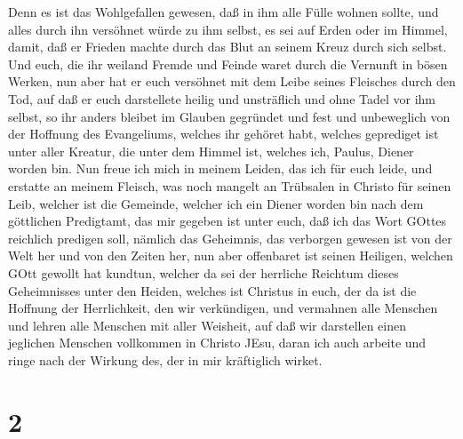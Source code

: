 Denn es ist das Wohlgefallen gewesen, daß in ihm alle Fülle wohnen
sollte,  und alles durch ihn versöhnet würde zu ihm selbst,
es sei auf Erden oder im Himmel, damit, daß er Frieden machte durch das
Blut an seinem Kreuz durch sich selbst.  Und euch, die ihr
weiland Fremde und Feinde waret durch die Vernunft in bösen Werken,
 nun aber hat er euch versöhnet mit dem Leibe seines
Fleisches durch den Tod, auf daß er euch darstellete heilig und
unsträflich und ohne Tadel vor ihm selbst,  so ihr anders
bleibet im Glauben gegründet und fest und unbeweglich von der Hoffnung
des Evangeliums, welches ihr gehöret habt, welches geprediget ist unter
aller Kreatur, die unter dem Himmel ist, welches ich, Paulus, Diener
worden bin.  Nun freue ich mich in meinem Leiden, das ich
für euch leide, und erstatte an meinem Fleisch, was noch mangelt an
Trübsalen in Christo für seinen Leib, welcher ist die Gemeinde,
 welcher ich ein Diener worden bin nach dem göttlichen
Predigtamt, das mir gegeben ist unter euch, daß ich das Wort GOttes
reichlich predigen soll,  nämlich das Geheimnis, das
verborgen gewesen ist von der Welt her und von den Zeiten her, nun aber
offenbaret ist seinen Heiligen,  welchen GOtt gewollt hat
kundtun, welcher da sei der herrliche Reichtum dieses Geheimnisses unter
den Heiden, welches ist Christus in euch, der da ist die Hoffnung der
Herrlichkeit,  den wir verkündigen, und vermahnen alle
Menschen und lehren alle Menschen mit aller Weisheit, auf daß wir
darstellen einen jeglichen Menschen vollkommen in Christo JEsu,
 daran ich auch arbeite und ringe nach der Wirkung des, der
in mir kräftiglich wirket.

\hypertarget{section-1}{%
\section{2}\label{section-1}}

